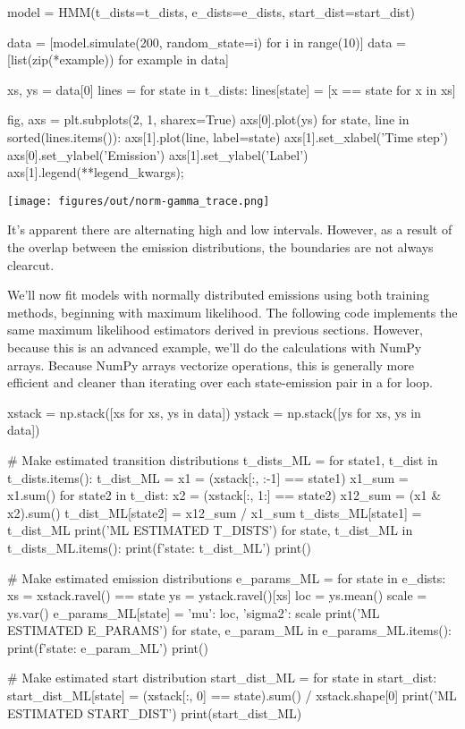 \begin{NotebookIn}
model = HMM(t_dists=t_dists, e_dists=e_dists, start_dist=start_dist)

data = [model.simulate(200, random_state=i) for i in range(10)]
data = [list(zip(*example)) for example in data]

xs, ys = data[0]
lines = {}
for state in t_dists:
    lines[state] = [x == state for x in xs]

fig, axs = plt.subplots(2, 1, sharex=True)
axs[0].plot(ys)
for state, line in sorted(lines.items()):
    axs[1].plot(line, label=state)
axs[1].set_xlabel('Time step')
axs[0].set_ylabel('Emission')
axs[1].set_ylabel('Label')
axs[1].legend(**legend_kwargs);
\end{NotebookIn}

\begin{NotebookImage}
\texttt{[image: figures/out/norm-gamma\_trace.png]}
\end{NotebookImage}

It's apparent there are alternating high and low intervals. However, as a result of the overlap between the emission distributions, the boundaries are not always clearcut.

We'll now fit models with normally distributed emissions using both training methods, beginning with maximum likelihood. The following code implements the same maximum likelihood estimators derived in previous sections. However, because this is an advanced example, we'll do the calculations with NumPy arrays. Because NumPy arrays vectorize operations, this is generally more efficient and cleaner than iterating over each state-emission pair in a for loop.

\begin{NotebookIn}
xstack = np.stack([xs for xs, ys in data])
ystack = np.stack([ys for xs, ys in data])

# Make estimated transition distributions
t_dists_ML = {}
for state1, t_dist in t_dists.items():
    t_dist_ML = {}
    x1 = (xstack[:, :-1] == state1)
    x1_sum = x1.sum()
    for state2 in t_dist:
        x2 = (xstack[:, 1:] == state2)
        x12_sum = (x1 & x2).sum()
        t_dist_ML[state2] = x12_sum / x1_sum
    t_dists_ML[state1] = t_dist_ML
print('ML ESTIMATED T_DISTS')
for state, t_dist_ML in t_dists_ML.items():
    print(f'{state}: {t_dist_ML}')
print()

# Make estimated emission distributions
e_params_ML = {}
for state in e_dists:
    xs = xstack.ravel() == state
    ys = ystack.ravel()[xs]
    loc = ys.mean()
    scale = ys.var()
    e_params_ML[state] = {'mu': loc, 'sigma2': scale}
print('ML ESTIMATED E_PARAMS')
for state, e_param_ML in e_params_ML.items():
    print(f'{state}: {e_param_ML}')
print()

# Make estimated start distribution
start_dist_ML = {}
for state in start_dist:
    start_dist_ML[state] = (xstack[:, 0] == state).sum() / xstack.shape[0]
print('ML ESTIMATED START_DIST')
print(start_dist_ML)
\end{NotebookIn}

